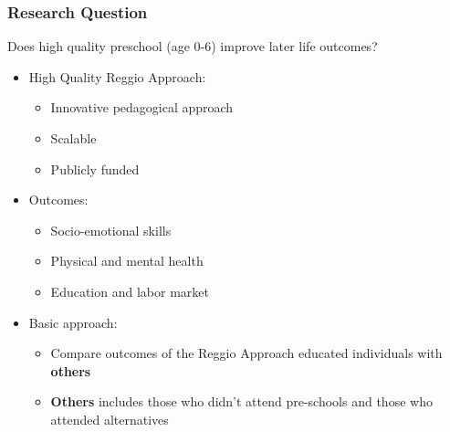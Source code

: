 \begin{frame}
\frametitle{Research Question} 

\begin{block}{}
Does high quality preschool (age 0-6) improve later life outcomes?
\end{block}

\vspace{2ex}

\begin{itemize}
	\item <2-> High Quality Reggio Approach:
	\begin{itemize}
		\item Innovative pedagogical approach
		\item Scalable
		\item Publicly funded
	\end{itemize}
	\vspace{1.5ex}
	\item <3-> Outcomes:
	\begin{itemize}
		\item Socio-emotional skills
		\item Physical and mental health
		\item Education and labor market
	\end{itemize}
	\vspace{1.5ex}
	\item <4-> Basic approach:
	\begin{itemize}
		\item Compare outcomes of the Reggio Approach educated individuals with \textbf{others}
		\item \textbf{Others} includes those who didn't attend pre-schools and those who attended alternatives

	\end{itemize}
\end{itemize}
\vspace{10ex}

\end{frame} 
